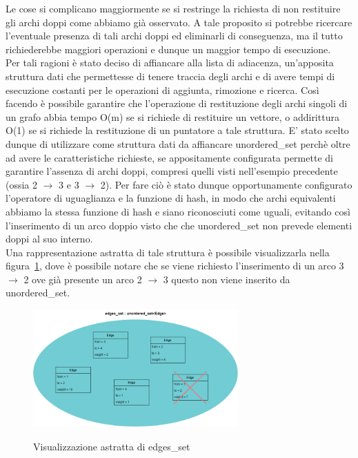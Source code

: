 Le cose si complicano maggiormente se si restringe la richiesta di non restituire gli archi doppi come abbiamo già osservato. A tale proposito si potrebbe ricercare l'eventuale presenza di tali archi doppi ed eliminarli di conseguenza, ma il tutto richiederebbe maggiori operazioni e dunque un maggior tempo di esecuzione.\\

Per tali ragioni è stato deciso di affiancare alla lista di adiacenza, un'apposita struttura dati che permettesse di tenere traccia degli archi e di avere tempi di esecuzione costanti per le operazioni di aggiunta, rimozione e ricerca. Così facendo è possibile garantire che l'operazione di restituzione degli archi singoli di un grafo abbia tempo O(m) se si richiede di restituire un vettore, o addirittura O(1) se si richiede la restituzione di un puntatore a tale struttura.
E' stato scelto dunque di utilizzare come struttura dati da affiancare unordered\_set perchè oltre ad avere le caratteristiche richieste, se appositamente configurata permette di garantire l'assenza di archi doppi, compresi quelli visti nell'esempio precedente (ossia 2 $\rightarrow$ 3 e 3 $\rightarrow$ 2). Per fare ciò è stato dunque opportunamente configurato l'operatore di uguaglianza e la funzione di hash, in  modo che archi equivalenti abbiamo la stessa funzione di hash e siano riconosciuti come uguali, evitando così l'inserimento di un arco doppio visto che che unordered\_set non prevede elementi doppi al suo interno.\\

Una rappresentazione astratta di tale struttura è possibile visualizzarla nella figura~\ref{fig:edges_set}, dove è possibile notare che se viene richiesto l'inserimento di un arco 3 $\rightarrow$ 2 ove già presente un arco 2 $\rightarrow$ 3 questo non viene inserito da unordered\_set.\\

\begin{figure}[h]
	\caption{Visualizzazione astratta di edges\_set}
	\centering
	\includegraphics[width=0.7\textwidth]{./images/edges_setAbstract.png}
	\label{fig:edges_set}
\end{figure}

